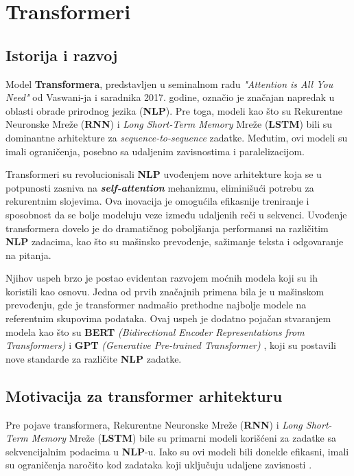 \documentclass[12pt]{article}
\begin{document}
   \newpage
   \section{Transformeri}
   \subsection{Istorija i razvoj}
   Model \textbf{Transformera}, predstavljen u seminalnom radu \textit{"Attention is All You Need"} \cite{attentionneed} od Vaswani-ja i saradnika 2017. godine, 
   označio je značajan napredak u oblasti obrade prirodnog jezika (\textbf{NLP}). 
   Pre toga, modeli kao što su Rekurentne Neuronske Mreže (\textbf{RNN}) \cite{rnn} i 
   \textit{Long Short-Term Memory} Mreže (\textbf{LSTM}) \cite{lstm} bili su dominantne arhitekture za 
   \textit{sequence-to-sequence} zadatke. Međutim, ovi modeli su imali ograničenja, 
   posebno sa udaljenim zavisnostima i paralelizacijom.

   Transformeri su revolucionisali \textbf{NLP} uvođenjem nove arhitekture koja se u potpunosti zasniva na 
   \textbf{\textit{self-attention}} mehanizmu, eliminišući potrebu za rekurentnim slojevima. 
   Ova inovacija je omogućila efikasnije treniranje i sposobnost da se bolje modeluju veze između 
   udaljenih reči u sekvenci. Uvođenje transformera dovelo je do dramatičnog poboljšanja performansi 
   na različitim \textbf{NLP} zadacima, kao što su mašinsko prevođenje, sažimanje teksta i odgovaranje na pitanja.

   Njihov uspeh brzo je postao evidentan razvojem moćnih modela koji su ih koristili kao osnovu. 
   Jedna od prvih značajnih primena bila je u mašinskom prevođenju, gde je transformer 
   nadmašio prethodne najbolje modele na referentnim skupovima podataka. 
   Ovaj uspeh je dodatno pojačan stvaranjem modela kao što su \textbf{BERT} 
   \textit{(Bidirectional Encoder Representations from Transformers)} \cite{bert} i \textbf{GPT} 
   \textit{(Generative Pre-trained Transformer)} \cite{gpt2}, koji su postavili nove standarde za 
   različite \textbf{NLP} zadatke.

   \subsection{Motivacija za transformer arhitekturu}

   Pre pojave transformera, Rekurentne Neuronske Mreže (\textbf{RNN}) i 
   \textit{Long Short-Term Memory} Mreže (\textbf{LSTM}) bile su primarni 
   modeli korišćeni za zadatke sa sekvencijalnim podacima u \textbf{NLP}-u. 
   Iako su ovi modeli bili donekle efikasni, imali su ograničenja naročito kod zadataka koji 
   uključuju udaljene zavisnosti \cite{trans_motivation}.
\end{document}
